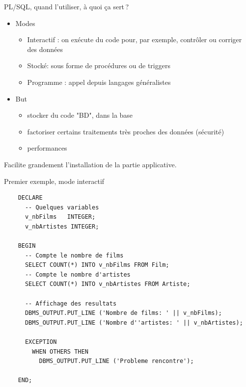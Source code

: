 \begin{frame}{PL/SQL, quand l'utiliser, à quoi ça sert\,?}

\begin{itemize}

  \item Modes
  \begin{itemize}
  \item Interactif : on exécute du code pour, par exemple, contrôler ou corriger des données
  \item Stocké: sous forme de procédures ou de triggers
   \item Programme : appel depuis langages généralistes
  \end{itemize}

  \item But
  \begin{itemize}
  \item stocker du code "BD", dans la base
  \item factoriser certains traitements très proches des données (sécurité)
   \item performances
  \end{itemize}
\end{itemize}

\vfill

\alert{Facilite grandement l'installation de la partie applicative.}
\end{frame}



\begin{frame}[fragile]{Premier exemple, mode interactif}

\begin{footnotesize}
\begin{verbatim}
    DECLARE
      -- Quelques variables
      v_nbFilms   INTEGER;
      v_nbArtistes INTEGER;

    BEGIN
      -- Compte le nombre de films
      SELECT COUNT(*) INTO v_nbFilms FROM Film;
      -- Compte le nombre d'artistes
      SELECT COUNT(*) INTO v_nbArtistes FROM Artiste;

      -- Affichage des resultats
      DBMS_OUTPUT.PUT_LINE ('Nombre de films: ' || v_nbFilms);
      DBMS_OUTPUT.PUT_LINE ('Nombre d''artistes: ' || v_nbArtistes);

      EXCEPTION
        WHEN OTHERS THEN 
          DBMS_OUTPUT.PUT_LINE ('Probleme rencontre');

    END;
\end{verbatim}
\end{footnotesize}
\end{frame}



